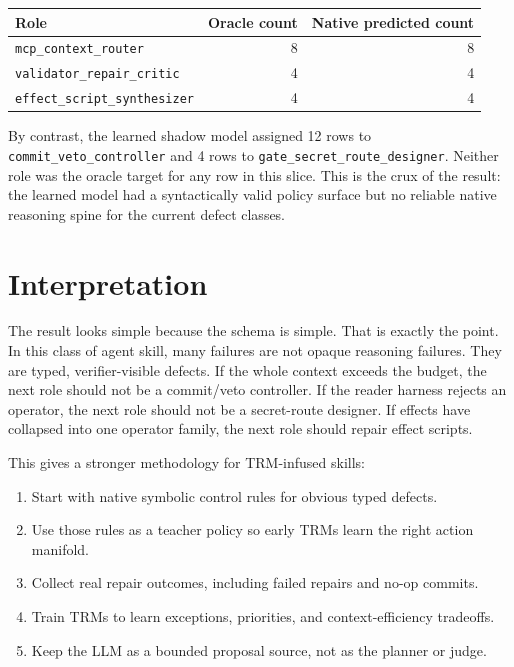 \documentclass[11pt]{article}
\begin{document}
\begin{center}
\begin{tabular}{lrr}
\toprule
Role & Oracle count & Native predicted count \\
\midrule
\texttt{mcp\_context\_router} & 8 & 8 \\
\texttt{validator\_repair\_critic} & 4 & 4 \\
\texttt{effect\_script\_synthesizer} & 4 & 4 \\
\bottomrule
\end{tabular}
\end{center}

By contrast, the learned shadow model assigned 12 rows to \texttt{commit\_veto\_controller} and 4 rows to \texttt{gate\_secret\_route\_designer}. Neither role was the oracle target for any row in this slice. This is the crux of the result: the learned model had a syntactically valid policy surface but no reliable native reasoning spine for the current defect classes.

\section{Interpretation}

The result looks simple because the schema is simple. That is exactly the point. In this class of agent skill, many failures are not opaque reasoning failures. They are typed, verifier-visible defects. If the whole context exceeds the budget, the next role should not be a commit/veto controller. If the reader harness rejects an operator, the next role should not be a secret-route designer. If effects have collapsed into one operator family, the next role should repair effect scripts.

This gives a stronger methodology for TRM-infused skills:

\begin{enumerate}
  \item Start with native symbolic control rules for obvious typed defects.
  \item Use those rules as a teacher policy so early TRMs learn the right action manifold.
  \item Collect real repair outcomes, including failed repairs and no-op commits.
  \item Train TRMs to learn exceptions, priorities, and context-efficiency tradeoffs.
  \item Keep the LLM as a bounded proposal source, not as the planner or judge.
\end{enumerate}
\end{document}
